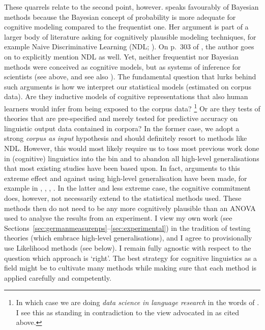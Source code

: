\documentclass[USenglish]{article}
\begin{document}
These quarrels relate to the second point, however.
\citet[301--302]{Divjak2016a} speaks favourably of Bayesian methods because the Bayesian concept of probability is more adequate for cognitive modeling compared to the frequentist one.
Her argument is part of a larger body of literature asking for cognitively plausible modeling techniques, for example Naive Discriminative Learning (NDL; \citealp{Baayen2011,BaayenEa2013,MilinEa2016,TheijssenEa2013}). 
On p.\ 303 of \cite{Divjak2016a}, the author goes on to explicitly mention NDL as well.
Yet, neither frequentist nor Bayesian methods were conceived as cognitive models, but as systems of inference for scientists (see above, and see also \citealp[302]{Divjak2016a}).
The fundamental question that lurks behind such arguments is how we interpret our statistical models (estimated on corpus data).
Are they inductive models of cognitive representations that also human learners would infer from being exposed to the corpus data?%
\footnote{In which case we are doing \textit{data science in language research} in the words of \citealp{MilinEa2016}.
I see this as standing in contradiction to the view advocated in \cite{Dabrowska2016} as cited above.}
Or are they tests of theories that are pre-specified and merely tested for predictive accuracy on linguistic output data contained in corpora?
In the former case, we adopt a strong \textit{corpus as input} hypothesis and should definitely resort to methods like NDL.
However, this would most likely require us to toss most previous work done in (cognitive) linguistics into the bin and to abandon all high-level generalisations that most existing studies have been based upon.
In fact, arguments to this extreme effect and against using high-level generalisation have been made, for example in \cite{BaayenEa2016}, \citet[299--300]{Divjak2016a}, \cite{RamscarPort2016}, \cite{TheijssenEa2013}.
In the latter and less extreme case, the cognitive commitment does, however, not necessarily extend to the statistical methods used.
These methods then do not need to be any more cognitively plausible than an ANOVA used to analyse the results from an experiment.
I view my own work (see Sections~\ref{sec:germanmeasurenps}--\ref{sec:experimental}) in the tradition of testing theories (which embrace high-level generalisations), and I agree to provisionally use Likelihood methods (see below).
I remain fully agnostic with respect to the question which approach is `right'.
The best strategy for cognitive linguistics as a field might be to cultivate many methods while making sure that each method is applied carefully and competently.
\end{document}
